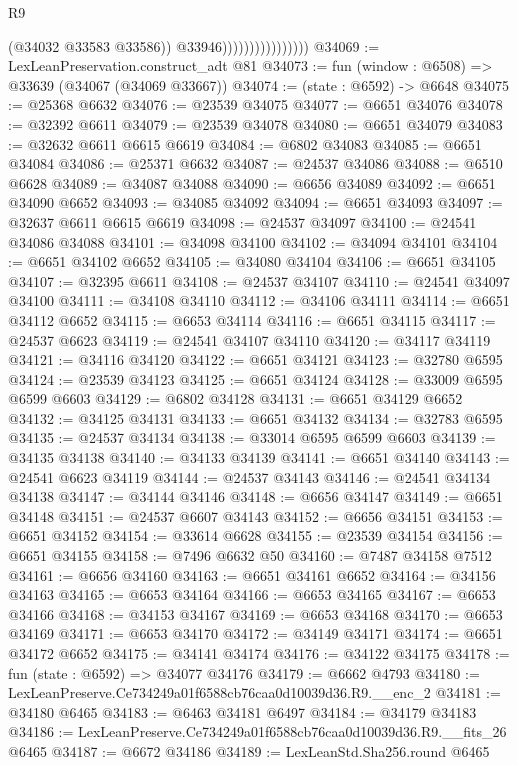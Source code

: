 \begin{lexlean}{R9}
\begin{coremodule}
                                      (@34032 @33583 @33586))
                                    @33946))))))))))))))))
@34069 := LexLeanPreservation.construct_adt @81
@34073 := fun (window : @6508) => @33639 (@34067 (@34069 @33667))
@34074 := (state : @6592) -> @6648
@34075 := @25368 @6632
@34076 := @23539 @34075
@34077 := @6651 @34076
@34078 := @32392 @6611
@34079 := @23539 @34078
@34080 := @6651 @34079
@34083 := @32632 @6611 @6615 @6619
@34084 := @6802 @34083
@34085 := @6651 @34084
@34086 := @25371 @6632
@34087 := @24537 @34086
@34088 := @6510 @6628
@34089 := @34087 @34088
@34090 := @6656 @34089
@34092 := @6651 @34090 @6652
@34093 := @34085 @34092
@34094 := @6651 @34093
@34097 := @32637 @6611 @6615 @6619
@34098 := @24537 @34097
@34100 := @24541 @34086 @34088
@34101 := @34098 @34100
@34102 := @34094 @34101
@34104 := @6651 @34102 @6652
@34105 := @34080 @34104
@34106 := @6651 @34105
@34107 := @32395 @6611
@34108 := @24537 @34107
@34110 := @24541 @34097 @34100
@34111 := @34108 @34110
@34112 := @34106 @34111
@34114 := @6651 @34112 @6652
@34115 := @6653 @34114
@34116 := @6651 @34115
@34117 := @24537 @6623
@34119 := @24541 @34107 @34110
@34120 := @34117 @34119
@34121 := @34116 @34120
@34122 := @6651 @34121
@34123 := @32780 @6595
@34124 := @23539 @34123
@34125 := @6651 @34124
@34128 := @33009 @6595 @6599 @6603
@34129 := @6802 @34128
@34131 := @6651 @34129 @6652
@34132 := @34125 @34131
@34133 := @6651 @34132
@34134 := @32783 @6595
@34135 := @24537 @34134
@34138 := @33014 @6595 @6599 @6603
@34139 := @34135 @34138
@34140 := @34133 @34139
@34141 := @6651 @34140
@34143 := @24541 @6623 @34119
@34144 := @24537 @34143
@34146 := @24541 @34134 @34138
@34147 := @34144 @34146
@34148 := @6656 @34147
@34149 := @6651 @34148
@34151 := @24537 @6607 @34143
@34152 := @6656 @34151
@34153 := @6651 @34152
@34154 := @33614 @6628
@34155 := @23539 @34154
@34156 := @6651 @34155
@34158 := @7496 @6632 @50
@34160 := @7487 @34158 @7512
@34161 := @6656 @34160
@34163 := @6651 @34161 @6652
@34164 := @34156 @34163
@34165 := @6653 @34164
@34166 := @6653 @34165
@34167 := @6653 @34166
@34168 := @34153 @34167
@34169 := @6653 @34168
@34170 := @6653 @34169
@34171 := @6653 @34170
@34172 := @34149 @34171
@34174 := @6651 @34172 @6652
@34175 := @34141 @34174
@34176 := @34122 @34175
@34178 := fun (state : @6592) => @34077 @34176
@34179 := @6662 @4793
@34180 := LexLeanPreserve.Ce734249a01f6588cb76caa0d10039d36.R9.__enc_2
@34181 := @34180 @6465
@34183 := @6463 @34181 @6497
@34184 := @34179 @34183
@34186 := LexLeanPreserve.Ce734249a01f6588cb76caa0d10039d36.R9.__fits_26 @6465
@34187 := @6672 @34186
@34189 := LexLeanStd.Sha256.round @6465

\end{coremodule}
\end{lexlean}

